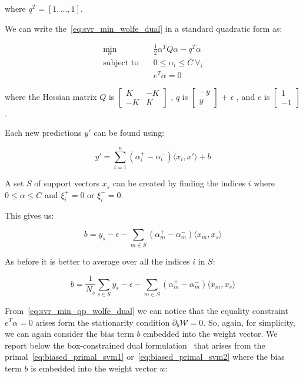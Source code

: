where $q^T = [1, \dots, 1]$.

We can write the~\eqref{eq:svr_min_wolfe_dual} in a standard quadratic form as:

\begin{equation}
    \begin{aligned} \label{eq:svr_min_qp_wolfe_dual}
        \min_{\alpha} \quad & \frac{1}{2}\alpha^T Q\alpha-q^T\alpha \\
            \text{subject to} \quad & 0\leq\alpha_i\leq C \ \forall_i \\ & e^T\alpha=0
    \end{aligned}
\end{equation}

where the Hessian matrix $Q$ is 
$
\begin{bmatrix}
K & -K\\
-K & K 
\end{bmatrix}$
, $q$ is 
$
\begin{bmatrix}
-y\\
y
\end{bmatrix}$ + $\epsilon$
, and $e$ is 
$
\begin{bmatrix}
1\\
-1
\end{bmatrix}$.

Each new predictions $y'$ can be found using:

\begin{equation} \label{eq:svr_pred}
    y'= \sum_{i=1}^n (\alpha_i^+ - \alpha_i^-)\langle x_i, x' \rangle+b
\end{equation}

A set $S$ of support vectors $x_s$ can be created by finding the indices $i$ where $0\leq\alpha\leq C$ and $\xi_i^+=0$ or $\xi_i^-=0$.

This gives us:

\begin{equation} \label{eq:svr_b}
    b=y_s-\epsilon-\sum_{m\in S}(\alpha_m^+ -\alpha_m^-) \langle x_m, x_s \rangle
\end{equation}

As before it is better to average over all the indices $i$ in $S$:

\begin{equation} \label{eq:svr_b_avg}
    b=\frac{1}{N_s}\sum_{s\in S}y_s-\epsilon-\sum_{m \in S}(\alpha_m^+ - \alpha_m^-)\langle x_m, x_s \rangle
\end{equation}

From~\eqref{eq:svr_min_qp_wolfe_dual} we can notice that the equality constraint $e^T \alpha = 0$ arises form the stationarity condition $\partial_{{b}} \mathcal{W}=0$. So, again, for simplicity, we can again consider the bias term $b$ embedded into the weight vector. We report below the box-constrained dual formulation~\cite{hsu2002simple} that arises from the primal~\eqref{eq:biased_primal_svm1} or~\eqref{eq:biased_primal_svm2} where the bias term $b$ is embedded into the weight vector $w$:

